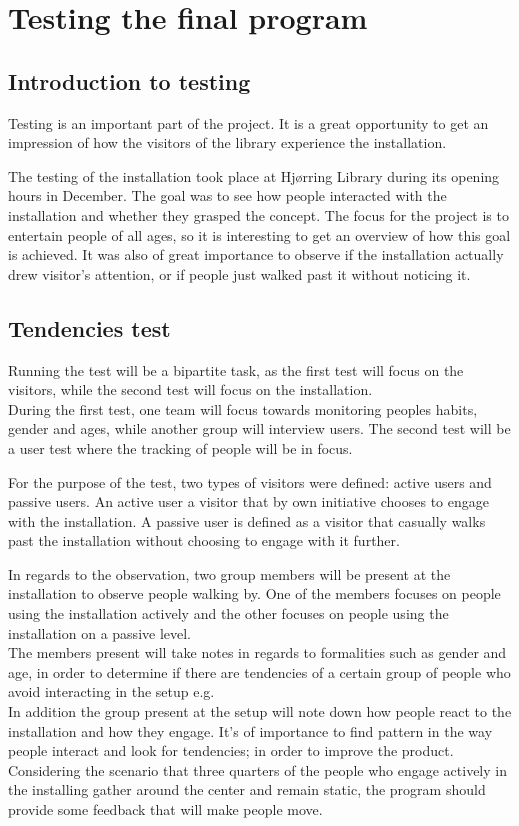 \chapter{Testing the final program}
\section{Introduction to testing}
Testing is an important part of the project. It is a great opportunity to get an impression of how the visitors of the library experience the installation.


The testing of the installation took place at Hj{\o}rring Library during its opening hours in December. The goal was to see how people interacted with the installation and whether they grasped the concept. The focus for the project is to entertain people of all ages, so it is interesting to get an overview of how this goal is achieved. It was also of great importance to observe if the installation actually drew visitor's attention, or if people just walked past it without noticing it.

\section{Tendencies test}
Running the test will be a bipartite task, as the first test will focus on the visitors, while the second test will focus on the installation.\\
During the first test, one team will focus towards monitoring peoples habits, gender and ages, while another group will interview users. The second test will be a user test where the tracking of people will be in focus.

For the purpose of the test, two types of visitors were defined: active users and passive users. An active user a visitor that by own initiative chooses to engage with the installation. A passive user is defined as a visitor that casually walks past the installation without choosing to engage with it further.

In regards to the observation, two group members will be present at the installation to observe people walking by. One of the members focuses on people using the installation actively and the other focuses on people using the installation on a passive level.\\
The members present will take notes in regards to formalities such as gender and age, in order to determine if there are tendencies of a certain group of people who avoid interacting in the setup e.g.\\
In addition the group present at the setup will note down how people react to the installation and how they engage. It's of importance to find pattern in the way people interact and look for tendencies; in order to improve the product. Considering the scenario that three quarters of the people who engage actively in the installing gather around the center and remain static, the program should provide some feedback that will make people move.

